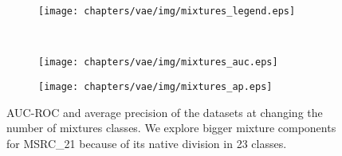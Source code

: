\begin{figure}[htp]
\centering
\begin{subfigure}{.8\textwidth}
\centering
\texttt{[image: chapters/vae/img/mixtures\_legend.eps]}
\end{subfigure}\\
\begin{subfigure}{.5\textwidth}
\centering
\texttt{[image: chapters/vae/img/mixtures\_auc.eps]}
\label{fig:vae:mixtures:auc}
\end{subfigure}%
\begin{subfigure}{.5\textwidth}
\centering
\texttt{[image: chapters/vae/img/mixtures\_ap.eps]}
\label{fig:vae:mixtures:ap}
\end{subfigure}
\caption{AUC-ROC and average precision of the datasets at changing the number of mixtures classes. We explore bigger mixture components for MSRC\_21 because of its native division in 23 classes.}
\label{fig:vae:mixtures}
\end{figure}

